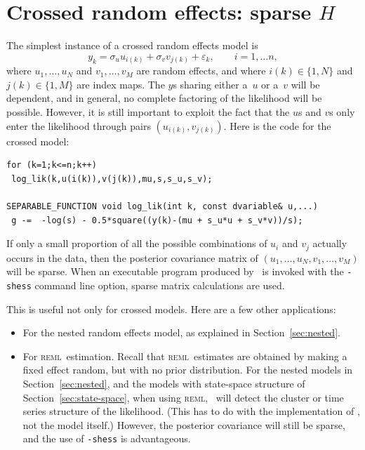 \documentclass{admbmanual}
\newcommand{\scREML}{\textsc{reml}}
\begin{document}
\section{Crossed random effects: sparse $H$}

The simplest instance of a crossed random effects model is
\[
  y_{k}= \sigma_u u_{i(k)} + \sigma_v v_{j(k)}+\varepsilon_{k},
            \qquad i=1,\ldots n,
\]
where $u_{1},\ldots,u_{N}$ and $v_{1},\ldots,v_{M}$ are random effects, 
and where $i(k)\in\{1,N\}$ and $j(k)\in\{1,M\}$ are index maps. The 
$y$s sharing either a~$u$ or a~$v$ will be dependent, and in general,
no complete factoring of the likelihood will be possible. However, it is still
important to exploit the fact that the $u$s and $v$s only enter the 
likelihood through pairs $(u_{i(k)},v_{j(k)})$. Here is the code for the
crossed model:
\begin{lstlisting}
for (k=1;k<=n;k++)
 log_lik(k,u(i(k)),v(j(k)),mu,s,s_u,s_v);

SEPARABLE_FUNCTION void log_lik(int k, const dvariable& u,...)
 g -=  -log(s) - 0.5*square((y(k)-(mu + s_u*u + s_v*v))/s);
\end{lstlisting}
If only a small proportion of all the possible combinations of $u_i$ and $v_j$ 
actually occurs in the data, then the posterior covariance matrix of
$(u_{1},\ldots,u_{N},v_{1},\ldots,v_{M})$ will be sparse. 
When an executable program produced by \scAR\ is invoked with the 
\texttt{-shess} command line option, sparse matrix calculations are used. 

This is useful not only for crossed models. Here are a few other applications:
\begin{itemize}
\item For the nested random effects model, as explained in Section~\ref{sec:nested}.
\item For \scREML\ estimation.  Recall that \scREML\ estimates are obtained by making
      a fixed effect random, but with no prior distribution. 
      For the nested models in Section~\ref{sec:nested},
      and the models with state-space structure of Section~\ref{sec:state-space},
      when using \scREML, \scAR\ will detect the cluster or time series structure
      of the likelihood. (This has to do with the implementation of \scAR, not
      the model itself.) However, the posterior covariance will still be sparse,
      and the use of \texttt{-shess} is advantageous.
\end{itemize}
\end{document}
